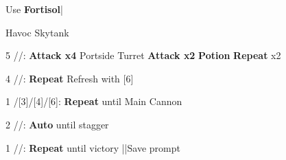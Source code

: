 \begin{mainlist}
	\item Use \textbf{Fortisol}|
\end{mainlist}
\begin{fight}{Havoc Skytank}
	\item [5] \com/\com/\syn: \textbf{Attack x4} Portside Turret \to \textbf{Attack x2} \to \textbf{Potion} \to \textbf{Repeat} x2
	\item [4] \com/\com/\med: \textbf{Repeat} \to Refresh with [6]
	\item [1]/[3]/[4]/[6]: \textbf{Repeat} until Main Cannon
	\item [2] \rav/\com/\rav: \textbf{Auto} until stagger
	\item [1] \com/\com/\rav: \textbf{Repeat} until victory |\skip|Save prompt
\end{fight}
